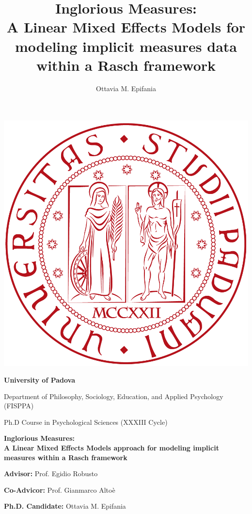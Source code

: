\documentclass[12pt]{book}
\title{Inglorious Measures: \\ A Linear Mixed Effects Models for modeling implicit measures data within a Rasch framework}
\author{Ottavia M. Epifania}
\begin{document}
	\frontmatter
	
	\thispagestyle{empty}
	
	\begin{center}
		\includegraphics[width=0.25\linewidth]{unipd.png}
	\end{center}
	
\begin{center}
	\begin{Large}
		\textbf{University of Padova}
		
		Department of Philosophy, Sociology, Education, and Applied Psychology (FISPPA)
	\end{Large}
	
\end{center}

\vspace{3mm}
\begin{center}
	\begin{large}
		Ph.D Course in Psychological Sciences (XXXIII Cycle)
	\end{large}
	
	\begin{huge}
		\bfseries
		Inglorious Measures: \\ A Linear Mixed Effects Models approach for modeling implicit measures within a Rasch framework
	\end{huge}
	
	
\end{center}

\vspace{2cm}
\begin{multicols}{2}
	\begin{flushleft}
		\begin{large}
			\textbf{Advisor:} Prof. Egidio Robusto
			
			\textbf{Co-Advicor:} Prof. Gianmarco Altoè
		\end{large}
		
	\end{flushleft}
	\columnbreak
	\begin{flushright}
		\vspace{1.5cm}
		\begin{large}
			\textbf{Ph.D. Candidate:} Ottavia M. Epifania
		\end{large}
	\end{flushright}
	
\end{multicols}
\end{document}
